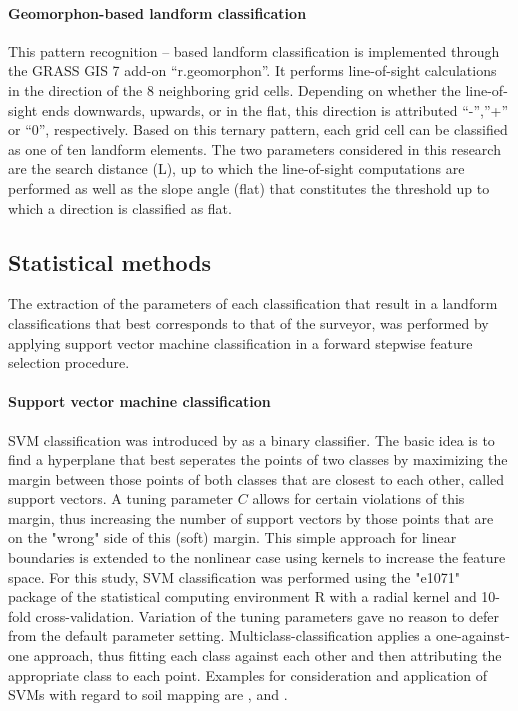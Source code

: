 \documentclass[preprint,12pt,authoryear]{elsarticle}
\begin{document}
\paragraph{Geomorphon-based landform classification \cite{Jasiewicz2013}}
This pattern recognition – based landform classification is implemented through the GRASS GIS 7 add-on “r.geomorphon”. It performs line-of-sight calculations in the direction of the 8 neighboring grid cells.  Depending on whether the line-of-sight ends downwards,  upwards, or in the flat, this direction is attributed “-”,”+” or “0”, respectively.  Based on this ternary pattern, each grid cell can be classified as one of ten landform elements. The two parameters considered in this research are the search distance (L), up to which the line-of-sight computations are performed as well as the slope angle (flat) that constitutes the threshold up to which a direction is classified as flat. 

\subsection{Statistical methods}
The extraction of the parameters of each classification that result in a landform classifications that best corresponds to that of the surveyor, was performed by applying support vector machine classification in a forward stepwise feature selection procedure.
\paragraph{Support vector machine classification}
SVM classification was introduced by \cite{Cortes1995} as a binary classifier. The basic idea is to find a hyperplane that best seperates the points of two classes by maximizing the margin between those points of both classes that are closest to each other, called support vectors. A tuning parameter $C$ allows for certain violations of this margin, thus increasing the number of support vectors by those points that are on the "wrong" side of this (soft) margin. This simple approach for linear boundaries is extended to the nonlinear case using kernels to increase the feature space. For this study, SVM classification was performed using the "e1071" package \citep{meyer2014} of the statistical computing environment R \citep{cran2014} with a radial kernel and 10-fold cross-validation. Variation of the tuning parameters gave  no reason to defer from the default parameter setting. Multiclass-classification applies a one-against-one approach, thus fitting each class against each other and then attributing the appropriate class to each point. Examples for consideration and application of SVMs with regard to soil mapping are \cite{Ballabio2009}, \cite{Behrens2006} and \cite{Rossel2010}.
\end{document}
